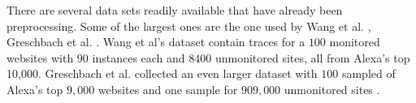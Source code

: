 There are several data sets readily available that have already been preprocessing.
Some of the largest ones are the one used by Wang et al. \cite{wang_cai_johnson_nithyanand_goldberg_2014}, Greschbach et al. \cite{greschbach2016effect}.
Wang et al's dataset contain traces for a $100$ monitored websites with $90$ instances each and $8400$ unmonitored sites, all from Alexa's top 10,000.
Greschbach et al. collected an even larger dataset with $100$ sampled of Alexa's top $9,000$ websites and one sample for $909,000$ unmonitored sites \cite{greschbach2016effect}.
